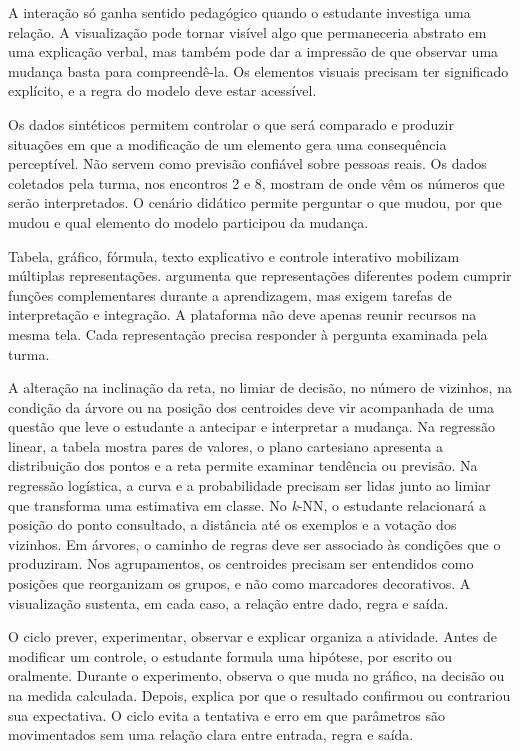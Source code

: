 A interação só ganha sentido pedagógico quando o estudante investiga uma relação. A visualização pode tornar visível algo que permaneceria abstrato em uma explicação verbal, mas também pode dar a impressão de que observar uma mudança basta para compreendê-la. Os elementos visuais precisam ter significado explícito, e a regra do modelo deve estar acessível.

Os dados sintéticos permitem controlar o que será comparado e produzir situações em que a modificação de um elemento gera uma consequência perceptível. Não servem como previsão confiável sobre pessoas reais. Os dados coletados pela turma, nos encontros 2 e 8, mostram de onde vêm os números que serão interpretados. O cenário didático permite perguntar o que mudou, por que mudou e qual elemento do modelo participou da mudança.

Tabela, gráfico, fórmula, texto explicativo e controle interativo mobilizam múltiplas representações.  argumenta que representações diferentes podem cumprir funções complementares durante a aprendizagem, mas exigem tarefas de interpretação e integração. A plataforma não deve apenas reunir recursos na mesma tela. Cada representação precisa responder à pergunta examinada pela turma.

A alteração na inclinação da reta, no limiar de decisão, no número de vizinhos, na condição da árvore ou na posição dos centroides deve vir acompanhada de uma questão que leve o estudante a antecipar e interpretar a mudança. Na regressão linear, a tabela mostra pares de valores, o plano cartesiano apresenta a distribuição dos pontos e a reta permite examinar tendência ou previsão. Na regressão logística, a curva e a probabilidade precisam ser lidas junto ao limiar que transforma uma estimativa em classe. No \textit{k}-NN, o estudante relacionará a posição do ponto consultado, a distância até os exemplos e a votação dos vizinhos. Em árvores, o caminho de regras deve ser associado às condições que o produziram. Nos agrupamentos, os centroides precisam ser entendidos como posições que reorganizam os grupos, e não como marcadores decorativos. A visualização sustenta, em cada caso, a relação entre dado, regra e saída.

O ciclo prever, experimentar, observar e explicar organiza a atividade. Antes de modificar um controle, o estudante formula uma hipótese, por escrito ou oralmente. Durante o experimento, observa o que muda no gráfico, na decisão ou na medida calculada. Depois, explica por que o resultado confirmou ou contrariou sua expectativa. O ciclo evita a tentativa e erro em que parâmetros são movimentados sem uma relação clara entre entrada, regra e saída.

